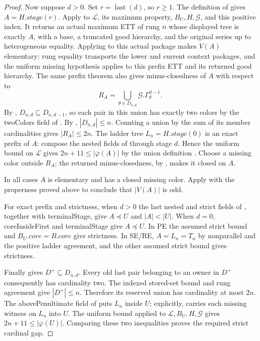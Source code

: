 \begin{proof}
Now suppose $d>0$. Set $r=\operatorname{last}(d)$, so $r\ge1$.
The definition of  gives
$A=H.\mathit{stage}(r)$.
Apply  to $\mathcal L$, its
maximum property, $B_U,H,\mathcal G$, and this positive index. It
returns an actual maximum ETT of rung $n$ whose displayed tree is
exactly $A$, with a base, a truncated good hierarchy, and the original
series up to heterogeneous equality. Applying
 to this actual package makes
$V(A)$ elementary: rung equality transports the lower and current
context packages, and the uniform missing hypothesis applies to
this prefix ETT and its returned good hierarchy. The same prefix
theorem also gives minus-closedness of $A$ with respect to
\[
 R_A=\bigcup_{\theta\in D_{n,d}}\mathcal G.\Gamma^{d-1}_\theta.
\]
By ,
$D_{n,d}\subseteq D_{n,d-1}$, so each pair in this union has exactly
two colors by the twoColors field of .
By , $|D_{n,d}|\le n$.
Counting a union by the sum of its member cardinalities gives
$|R_A|\le2n$.
The ladder tree $L_n=H.\mathit{stage}(0)$ is an exact prefix of $A$:
compose the nested fields of  through
stage $d$. Hence the uniform bound on $\mathcal L$ gives
$2n+11\le|\overline\varphi(A)|$ by the union definition
. Choose a missing color outside $R_A$;
the returned minus-closedness, by ,
makes it closed on $A$.

In all cases $A$ is elementary and has a closed missing color.
Apply  with the properness
proved above to conclude that $|V(A)|$ is odd.

For exact prefix and strictness, when $d>0$ the last nested and strict
fields of , together with terminalStage,
give $A\preccurlyeq U$ and $|A|<|U|$. When $d=0$, coreInsideFirst and
terminalStage give $A\preccurlyeq U$. In PE the assumed strict bound
and $B_U.\mathit{core}=B.\mathit{core}$ give strictness. In SE/RE,
$A=L_n=T_n$ by nonparallel and the positive ladder agreement, and
the other assumed strict bound gives strictness.

Finally  gives
$D^+\subseteq D_{n,d}$. Every old last pair belonging to an owner
in $D^+$ consequently has cardinality two. The indexed stored-set
bound  and rung agreement
give $|D^+|\le n$. Therefore its reserved union has cardinality at
most $2n$. The abovePenultimate field of
 puts $L_n$ inside $U$; explicitly,
 carries each
missing witness on $L_n$ into $U$. The uniform bound applied to
$\mathcal L,B_U,H,\mathcal G$ gives
$2n+11\le|\overline\varphi(U)|$. Comparing these two inequalities
proves the required strict cardinal gap.
\end{proof}
